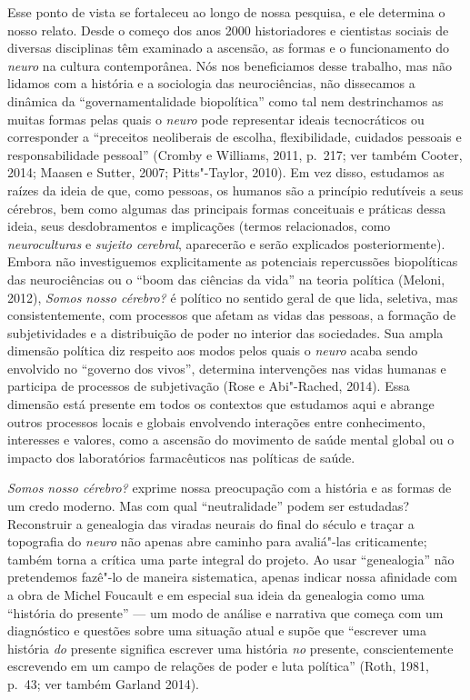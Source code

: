 Esse ponto de vista se fortaleceu ao longo de nossa pesquisa, e ele
determina o nosso relato. Desde o começo dos anos 2000 historiadores e
cientistas sociais de diversas disciplinas têm examinado a ascensão, as
formas e o funcionamento do \emph{neuro} na cultura contemporânea. Nós
nos beneficiamos desse trabalho, mas não lidamos com a história e a
sociologia das neurociências, não dissecamos a dinâmica da
``governamentalidade biopolítica'' como tal nem destrinchamos as muitas
formas pelas quais o \emph{neuro} pode representar ideais tecnocráticos
ou corresponder a ``preceitos neoliberais de escolha, flexibilidade,
cuidados pessoais e responsabilidade pessoal'' (Cromby e Williams, 2011,
p.~217; ver também Cooter, 2014; Maasen e Sutter, 2007; Pitts"-Taylor,
2010). Em vez disso, estudamos as raízes da ideia de que, como pessoas,
os humanos são a princípio redutíveis a seus cérebros, bem como algumas
das principais formas conceituais e práticas dessa ideia, seus
desdobramentos e implicações (termos relacionados, como
\emph{neuroculturas} e \emph{sujeito cerebral}, aparecerão e serão
explicados posteriormente). Embora não investiguemos explicitamente as
potenciais repercussões biopolíticas das neurociências ou o ``boom das
ciências da vida'' na teoria política (Meloni, 2012), \emph{Somos nosso
cérebro?} é político no sentido geral de que lida, seletiva, mas
consistentemente, com processos que afetam as vidas das pessoas, a
formação de subjetividades e a distribuição de poder no interior das
sociedades. Sua ampla dimensão política diz respeito aos modos pelos
quais o \emph{neuro} acaba sendo envolvido no ``governo dos vivos'',
determina intervenções nas vidas humanas e participa de processos de
subjetivação (Rose e Abi"-Rached, 2014). Essa dimensão está presente em
todos os contextos que estudamos aqui e abrange outros processos locais
e globais envolvendo interações entre conhecimento, interesses e
valores, como a ascensão do movimento de saúde mental global ou o
impacto dos laboratórios farmacêuticos nas políticas de saúde.

\emph{Somos nosso cérebro?} exprime nossa preocupação com a história e
as formas de um credo moderno. Mas com qual ``neutralidade'' podem ser
estudadas? Reconstruir a genealogia das viradas neurais do final do
século  e traçar a topografia do \emph{neuro} não apenas abre caminho
para avaliá"-las criticamente; também torna a crítica uma parte integral
do projeto. Ao usar ``genealogia'' não pretendemos fazê"-lo de maneira
sistematica, apenas indicar nossa afinidade com a obra de Michel
Foucault e em especial sua ideia da genealogia como uma ``história do
presente'' --- um modo de análise e narrativa que começa com um
diagnóstico e questões sobre uma situação atual e supõe que ``escrever
uma história \emph{do} presente significa escrever uma história
\emph{no} presente, conscientemente escrevendo em um campo de relações
de poder e luta política'' (Roth, 1981, p.~43; ver também Garland 2014).

